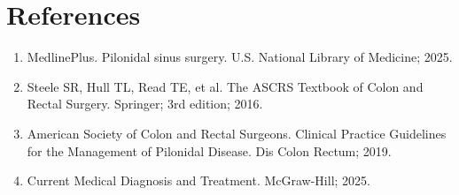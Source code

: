 \section*{References}
\begin{enumerate}
  \item MedlinePlus. Pilonidal sinus surgery. U.S. National Library of Medicine; 2025.
  \item Steele SR, Hull TL, Read TE, et al. The ASCRS Textbook of Colon and Rectal Surgery. Springer; 3rd edition; 2016.
  \item American Society of Colon and Rectal Surgeons. Clinical Practice Guidelines for the Management of Pilonidal Disease. Dis Colon Rectum; 2019.
  \item Current Medical Diagnosis and Treatment. McGraw-Hill; 2025.
\end{enumerate}

\clearpage
